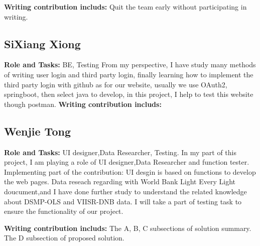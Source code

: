 \documentclass[conference]{IEEEtran}
\begin{document}
\textbf{Writing contribution includs:} Quit the team early without participating in writing.

\subsection{SiXiang Xiong}
\textbf{Role and Tasks:} BE, Testing
From my perspective, I have study many methods of writing user login and third party login,
finally learning how to implement the third party login with github as for our website,
usually we use OAuth2, springboot, then select java to develop, in this project, I help to test
this website though postman.
\textbf{Writing contribution includs:} 

\subsection{Wenjie Tong} 
\textbf{Role and Tasks:} UI designer,Data Researcher, Testing.
    In my part of this project, I am playing a role of UI designer,Data Researcher and function 
    tester. 
    Implementing part of the contribution:
    UI desgin is based on functions to develop the web pages.
    Data reseach regarding with World Bank Light Every Light doucument,and I have done further 
    study to understand the related knowledge about DSMP-OLS and VIISR-DNB data.
    I will take a part of testing task to ensure the functionality of our project.

\textbf{Writing contribution includs:} The A, B, C subsections of solution summary. 
	The D subsection of proposed solution.
  
\printbibliography
\end{document}
